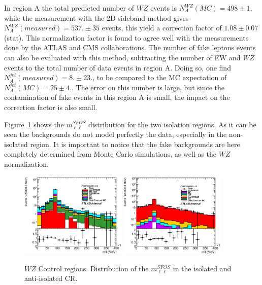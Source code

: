 In region A the total predicted number of $WZ$ events is $N_A^{WZ}(MC)=498{}\pm 1$, while the measurement with the 2D-sideband method gives $N_A^{WZ}(measured)=537.\pm{}35$ events, this yield a correction factor of $1.08 \pm 0.07$(stat). This normalization factor is found to agree well with the measurements done by the ATLAS and CMS collaborations. 
The number of fake leptons events can also be evaluated with this method, subtracting the number of EW and $WZ$ events to the total number of data events in region A. Doing so, one find $N^{jet}_{A}(measured)=8. \pm 23.$, to be compared to the MC expectation of $N^{jet}_{A}(MC)=25 \pm 4.$. The error on this number is large, but since the contamination of fake events in this region A is small, the impact on the correction factor is also small.

Figure~\ref{fig:WZ_CR} shows the $m_{\ell\ell}^{SFOS}$ distribution for the two isolation regions. As it can be seen the backgrounds do not model perfectly the data, especially in the non-isolated region. It is important to notice that the fake backgrounds are here completely determined from Monte Carlo simulations, as well as the $WZ$ normalization.

\begin{figure}[htp]
\centering
\includegraphics[width=0.45\textwidth]{figures/WZ_CR/2DSideband_WZCR_Isolated}
\includegraphics[width=0.45\textwidth]{figures/WZ_CR/2DSideband_WZCR_NonIsolated}
\caption{$WZ$ Control regions. Distribution of the $m_{\ell\ell}^{SFOS}$ in the isolated and anti-isolated CR.}
\label{fig:WZ_CR}
\end{figure}  

